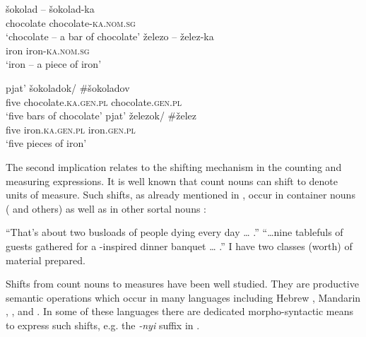 \documentclass[output=paper]{langscibook}
\begin{document}
\begin{exe}
\ex\label{ex:khrizmann:42}
       \begin{xlist}
           \ex\label{ex:khrizmann:42a} \gll šokolad -- šokolad-ka\\
          chocolate {}{} chocolate-\textsc{ka.nom.sg}\\
\glt `chocolate -- a bar of chocolate'
          \ex\label{ex:khrizmann:42b} \gll železo -- želez-ka\\
            iron {}{} iron-\textsc{ka.nom.sg}\\
            \glt `iron -- a piece of iron'\\
        \end{xlist}

\ex\label{ex:khrizmann:43}
       \begin{xlist}
            \ex\label{ex:khrizmann:43a} \gll pjat' šokoladok/ \#šokoladov\\
            five chocolate.\textsc{ka.gen.pl} \phantom{\#}chocolate.\textsc{gen.pl}\\
           \glt `five bars of chocolate'
           \ex\label{ex:khrizmann:43b} \gll pjat' železok/ \#želez\\
            five iron.\textsc{ka.gen.pl} \phantom{\#}iron.\textsc{gen.pl}\\
           \glt `five pieces of iron'\\
       \end{xlist}
\end{exe}

\noindent The second implication relates to the shifting mechanism in the counting and measuring expressions. It is well known that count nouns can shift to denote units of measure. Such shifts, as already mentioned in , occur in container nouns (\citealt{Doetjes1997,Landman2004,Rothstein2009} and others) as well as in other sortal nouns  \citep{Rothstein2017}:

\ea\label{ex:khrizmann:44}
    \ea ``That's about two busloads of people dying every day {\dots} .''
    \ex ``\dots nine tablefuls of guests gathered for a -inspired dinner banquet {\dots} .''
    \ex I have two classes (worth) of material prepared. \hfill \citep[216f.]{Rothstein2017}
\z\z

\noindent Shifts from count nouns to measures have been well studied. They are productive semantic operations which occur in many languages including Hebrew \citep{Rothstein2009}, Mandarin \citep{Li2013},  \citep{Schvarcz2014}, and  \citep{Partee.Borschev2012,Khrizman2016,Khrizman2016b}. In some of these languages there are dedicated morpho-syntactic means to express such shifts, e.g. the \textit{-nyi} suffix in  \citep{Schvarcz2014,Schvarcz2017}.
\end{document}
